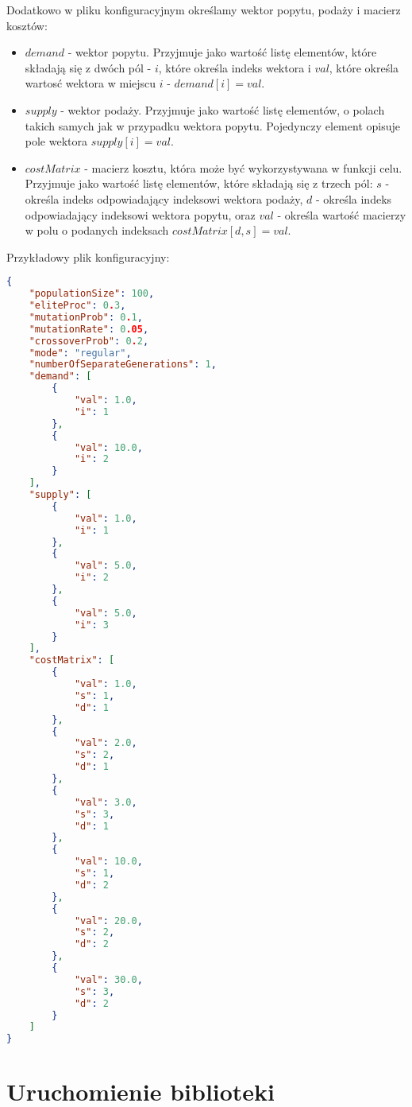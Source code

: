 Dodatkowo w pliku konfiguracyjnym określamy wektor popytu, podaży i macierz kosztów:

\begin{itemize}
    \item $demand$ - wektor popytu. Przyjmuje jako wartość listę elementów, które składają się z dwóch pól - $i$, które określa indeks wektora i 
    $val$, które określa wartosć wektora w miejscu $i$ - $demand[i] = val$.
    \item $supply$ - wektor podaży. Przyjmuje jako wartość listę elementów, o polach takich samych jak w przypadku wektora popytu. Pojedynczy element 
    opisuje pole wektora $supply[i] = val$.
    \item $costMatrix$ - macierz kosztu, która może być wykorzystywana w funkcji celu. Przyjmuje jako wartość listę elementów, które składają się 
    z trzech pól: $s$ - określa indeks odpowiadający indeksowi wektora podaży, $d$ - określa indeks odpowiadający indeksowi wektora popytu, oraz 
    $val$ - określa wartość macierzy w polu o podanych indeksach $costMatrix[d, s] = val$.
\end{itemize}

Przykładowy plik konfiguracyjny:

\begin{lstlisting}[language=json, firstnumber=1, frame=single]
{
    "populationSize": 100,
    "eliteProc": 0.3,
    "mutationProb": 0.1,
    "mutationRate": 0.05,
    "crossoverProb": 0.2,
    "mode": "regular",
    "numberOfSeparateGenerations": 1,
    "demand": [
        {
            "val": 1.0,
            "i": 1
        },
        {
            "val": 10.0,
            "i": 2
        }
    ],
    "supply": [
        {
            "val": 1.0,
            "i": 1
        },
        {
            "val": 5.0,
            "i": 2
        },
        {
            "val": 5.0,
            "i": 3
        }
    ],
    "costMatrix": [
        {
            "val": 1.0,
            "s": 1,
            "d": 1
        },
        {
            "val": 2.0,
            "s": 2,
            "d": 1
        },
        {
            "val": 3.0,
            "s": 3,
            "d": 1
        },
        {
            "val": 10.0,
            "s": 1,
            "d": 2
        },
        {
            "val": 20.0,
            "s": 2,
            "d": 2
        },
        {
            "val": 30.0,
            "s": 3,
            "d": 2
        }
    ]
}
\end{lstlisting}

\section{Uruchomienie biblioteki}

